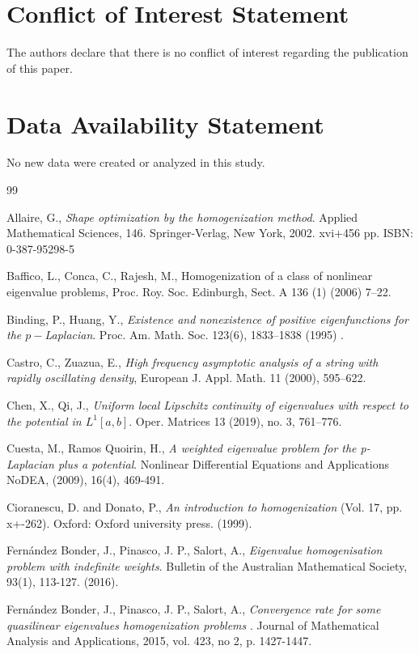 \documentclass[12pt]{amsart}
\theoremstyle{definition}
\theoremstyle{remark}
\numberwithin{equation}{section}
\begin{document}
\section*{Conflict of Interest Statement}
The authors declare that there is no conflict of interest regarding the publication of this paper.

\section*{Data Availability Statement}
No new data were created or analyzed in this study.




\begin{thebibliography}{99}




Allaire, G., \emph{Shape optimization by the homogenization method}. Applied Mathematical Sciences, 146. Springer-Verlag, New York, 2002. xvi+456 pp. ISBN: 0-387-95298-5

Baffico, L., Conca, C., Rajesh, M., Homogenization of a class of nonlinear eigenvalue problems, Proc. Roy. Soc. Edinburgh, Sect. A 136 (1) (2006) 7–22.

Binding, P., Huang, Y., \emph{Existence and nonexistence of positive eigenfunctions
for the $p-$Laplacian}. Proc. Am. Math. Soc. 123(6), 1833–1838 (1995) .

Castro, C., Zuazua, E., \emph{High frequency asymptotic analysis of a string with rapidly
oscillating density}, European J. Appl. Math. 11 (2000), 595–622.

Chen, X., Qi, J., \emph{Uniform local Lipschitz continuity of eigenvalues with respect to the potential in $L^1[a,b]$}. Oper. Matrices 13 (2019), no. 3, 761--776.
 
Cuesta, M.,  Ramos Quoirin, H., \emph{A weighted eigenvalue problem for the p-Laplacian plus a potential}. Nonlinear Differential Equations and Applications NoDEA, (2009), 16(4), 469-491.

Cioranescu, D. and Donato, P., \emph{An introduction to homogenization} (Vol. 17, pp. x+-262). Oxford: Oxford university press. (1999).


Fern\'andez Bonder, J., Pinasco, J. P.,   Salort, A., \emph{Eigenvalue homogenisation problem with indefinite weights}. Bulletin of the Australian Mathematical Society, 93(1), 113-127. (2016).

Fern\'andez Bonder, J., Pinasco, J. P.,   Salort, A., \emph{Convergence rate for some quasilinear eigenvalues homogenization problems} . Journal of Mathematical Analysis and Applications, 2015, vol. 423, no 2, p. 1427-1447.



\end{thebibliography}
\end{document}
